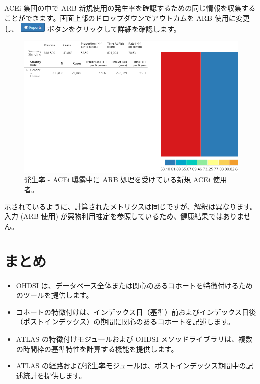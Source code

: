 \documentclass[
  11pt]{book}
\makeatletter
\newenvironment{kframe}{%
\medskip{}
\setlength{\fboxsep}{.8em}
 \def\at@end@of@kframe{}%
 \ifinner\ifhmode%
  \def\at@end@of@kframe{\end{minipage}}%
  \begin{minipage}{\columnwidth}%
 \fi\fi%
 \def\FrameCommand##1{\hskip\@totalleftmargin \hskip-\fboxsep
 \colorbox{myShadeColor}{##1}\hskip-\fboxsep
     \hskip-\linewidth \hskip-\@totalleftmargin \hskip\columnwidth}%
 \MakeFramed {\advance\hsize-\width
   \@totalleftmargin\z@ \linewidth\hsize
   \@setminipage}}%
 {\par\unskip\endMakeFramed%
 \at@end@of@kframe}
\newenvironment{rmdblock}[1]
  {
  \begin{itemize}
  \renewcommand{\labelitemi}{
    \raisebox{-.7\height}[0pt][0pt]{
      {\setkeys{Gin}{width=3em,keepaspectratio}\texttt{[image: images/\#1]}}
    }
  }
  \setlength{\fboxsep}{1em}
  \begin{kframe}
  \item
  }
  {
  \end{kframe}
  \end{itemize}
  }
\newenvironment{rmdsummary}
  {\begin{rmdblock}{summary}}
  {\end{rmdblock}}
\theoremstyle{definition}
\theoremstyle{definition}
\theoremstyle{definition}
\theoremstyle{definition}
\theoremstyle{remark}
\makeatother
\begin{document}
ACEi 集団の中で ARB 新規使用の発生率を確認するための同じ情報を収集することができます。画面上部のドロップダウンでアウトカムを ARB 使用に変更し、 \includegraphics{images/Characterization/atlasIncidenceReportButton.png} ボタンをクリックして詳細を確認します。

\begin{figure}

{\centering \includegraphics[width=1\linewidth]{images/Characterization/atlasIncidenceResultsARB} 

}

\caption{発生率 - ACEi 曝露中に ARB 処理を受けている新規 ACEi 使用者。}\label{fig:atlasIncidenceResultsARB}
\end{figure}

示されているように、計算されたメトリクスは同じですが、解釈は異なります。入力 (ARB 使用) が薬物利用推定を参照しているため、健康結果ではありません。

\section{まとめ}\label{ux307eux3068ux3081-8}

\begin{rmdsummary}
\begin{itemize}
\item
  OHDSI は、データベース全体または関心のあるコホートを特徴付けるためのツールを提供します。
\item
  コホートの特徴付けは、インデックス日（基準）前およびインデックス日後（ポストインデックス）の期間に関心のあるコホートを記述します。
\item
  ATLAS の特徴付けモジュールおよび OHDSI メソッドライブラリは、複数の時間枠の基準特性を計算する機能を提供します。
\item
  ATLAS の経路および発生率モジュールは、ポストインデックス期間中の記述統計を提供します。
\end{itemize}
\end{rmdsummary}
\end{document}
